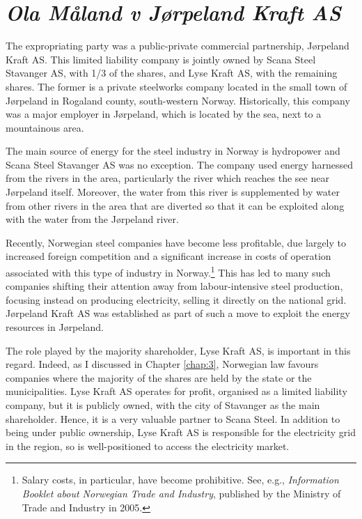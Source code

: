 \section{{\it Ola Måland v Jørpeland Kraft AS}}\label{sec:jorpeland}

The expropriating party was a public-private commercial partnership, Jørpeland Kraft AS. This limited liability company is jointly owned by Scana Steel Stavanger AS, with 1/3 of the shares, and Lyse Kraft AS, with the remaining shares. The former is a private steelworks company located in the small town of Jørpeland in Rogaland county, south-western Norway. Historically, this company was a major employer in Jørpeland, which is located by the sea, next to a mountainous area.

The main source of energy for the steel industry in Norway is hydropower and Scana Steel Stavanger AS was no exception. The company used energy harnessed from the rivers in the area, particularly the river which reaches the see near Jørpeland itself. Moreover, the water from this river is supplemented by water from other rivers in the area that are diverted so that it can be exploited along with the water from the Jørpeland river.

Recently, Norwegian steel companies have become less profitable, due largely to increased foreign competition and a significant increase in costs of operation associated with this type of industry in Norway.\footnote{Salary costs, in particular, have become prohibitive. See, e.g., \emph{Information Booklet about Norwegian Trade and Industry}, published by the Ministry of Trade and Industry in 2005.} This has led to many such companies shifting their attention away from labour-intensive steel production, focusing instead on producing electricity, selling it directly on the national grid. Jørpeland Kraft AS was established as part of such a move to exploit the energy resources in Jørpeland.


The role played by the majority shareholder, Lyse Kraft AS, is important in this regard. Indeed, as I discussed in Chapter \ref{chap:3}, Norwegian law favours companies where the majority of the shares are held by the state or the municipalities. Lyse Kraft AS operates for profit, organised as a limited liability company, but it is publicly owned, with the city of Stavanger as the main shareholder. Hence, it is a very valuable partner to Scana Steel. In addition to being under public ownership, Lyse Kraft AS is responsible for the electricity grid in the region, so is well-positioned to access the electricity market.

